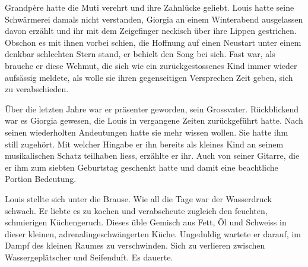 Grandpère hatte die Muti verehrt und ihre Zahnlücke geliebt. Louis hatte seine Schwärmerei damals nicht verstanden, Giorgia an einem Winterabend ausgelassen davon erzählt und ihr mit dem Zeigefinger neckisch über ihre Lippen gestrichen. 
Obschon es mit ihnen vorbei schien, die Hoffnung auf einen Neustart unter einem denkbar schlechten Stern stand, er  behielt den Song bei sich. Fast war, als brauche er diese Wehmut, die sich wie ein zurückgestossenes Kind immer wieder aufsässig meldete, als wolle sie ihren gegenseitigen Versprechen Zeit geben, sich zu verabschieden.


Über die letzten Jahre war er präsenter geworden, sein Grossvater. Rückblickend war es Giorgia gewesen, die Louis in vergangene Zeiten zurückgeführt hatte. Nach seinen wiederholten Andeutungen hatte sie mehr wissen wollen. Sie hatte ihm still zugehört. Mit welcher Hingabe er ihn bereits als kleines Kind an seinem musikalischen Schatz teilhaben liess, erzählte er ihr. Auch von seiner Gitarre, die er ihm zum siebten Geburtstag geschenkt hatte und damit eine beachtliche Portion Bedeutung. 

\sectionbreak


\sectionbreak

Louis stellte sich unter die Brause. Wie all die Tage war der Wasserdruck schwach. 
Er liebte es zu kochen und verabscheute zugleich den feuchten, schmierigen Küchengeruch. Dieses üble Gemisch aus Fett, Öl und Schweiss in dieser kleinen, adrenalingeschwängerten Küche. Ungeduldig wartete er darauf, im Dampf des kleinen Raumes zu verschwinden. Sich zu verlieren zwischen Wassergeplätscher und Seifenduft. Es dauerte.
     
